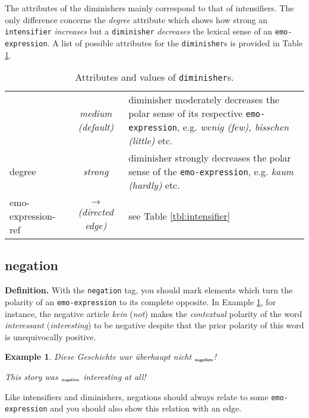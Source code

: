 \documentclass[11pt,a4paper]{article}
\newlength{\clmnwidth}
\theoremstyle{mytheoremstyle}
\newtheorem{exmp}{Example}[section]
\newcommand{\mtag}[2]{{\upshape[\emph{#2}\upshape]$_{\textrm{\bfseries\emph{\tiny
        #1}}}$}}
\newcommand{\negation}[2][]{\mtag{ne\-ga\-tion\ifstrempty{#1}{}{:#1}}{#2}}
\begin{document}
The attributes of the diminishers mainly correspond to that of
intensifiers.  The only difference concerns the \textit{degree}
attribute which shows how strong an \texttt{intensifier}
\emph{increases} but a \texttt{diminisher} \emph{decreases} the
lexical sense of an \texttt{emo-expression}.  A list of possible
attributes for the \texttt{diminisher}s is provided in Table
\ref{tbl:diminisher}.
\begin{center}
  \begin{table}[hb]
    \caption{Attributes and values of \texttt{diminisher}s.}
    \begin{tabular}{|l|c|p{0.88\clmnwidth}|}\hline

      & \textit{medium (default)} & diminisher moderately decreases
      the polar sense of its respective \texttt{emo-expression},
      e.g. \textit{wenig (few), bisschen (little)} etc.\\\cline{2-3}

      \multirow{-2}{*}{degree} & \textit{strong} & diminisher strongly
      decreases the polar sense of the \texttt{emo-expression},
      e.g. \textit{kaum (hardly)} etc.\\\hline

      emo-expression-ref & \textit{$\longrightarrow$\newline(directed
        edge)} & see Table \ref{tbl:intensifier}\\\hline
    \end{tabular}
    \label{tbl:diminisher}
  \end{table}
\end{center}

\subsection{negation}
\noindent\textbf{Definition.} With the \texttt{negation} tag, you
should mark elements which turn the polarity of an
\texttt{emo-expression} to its complete opposite.  In Example
\ref{exmp:negation}, for instance, the negative article \textit{kein}
(\textit{not}) makes the \emph{contextual} polarity of the word
\textit{interessant} (\textit{interesting}) to be negative despite
that the prior polarity of this word is unequivocally positive.
\begin{exmp}
Diese Geschichte war \"uberhaupt nicht \negation{interessant}!

This story was \negation{not} interesting at all!\label{exmp:negation}
\end{exmp}
Like intensifiers and diminishers, negations should always relate to
some \texttt{emo-expression} and you should also show this relation
with an edge.
\end{document}

